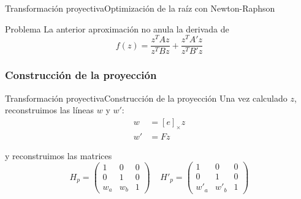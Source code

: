 \documentclass[14pt,spanish]{beamer}
\begin{document}
        \begin{frame}{Transformación proyectiva}{Optimización de la raíz con Newton-Raphson}

            \begin{alertblock}{Problema}
                La anterior aproximación no anula la derivada de \[f(z) = \frac{z^T Az}{z^T Bz} + \frac{z^T A'z}{z^T B'z}\]

            \end{alertblock}


        \end{frame}
        \subsubsection{Construcción de la proyección}

          \begin{frame}{Transformación proyectiva}{Construcción de la proyección}
              Una vez calculado $z$, reconstruimos las líneas  $w$ y $w'$:
              \begin{align*}
                w &= [e]_\times z\\
                w' &= Fz
              \end{align*}

              y reconstruimos las matrices \[H_p =
              \begin{pmatrix}
                  1 & 0 & 0 \\
                  0 & 1 & 0 \\
                  w_a & w_b & 1
              \end{pmatrix}\;\;\;\;
              H'_p =
              \begin{pmatrix}
                  1 & 0 & 0 \\
                  0 & 1 & 0 \\
                  w'_a & w'_b & 1
              \end{pmatrix}\]
          \end{frame}
\end{document}

